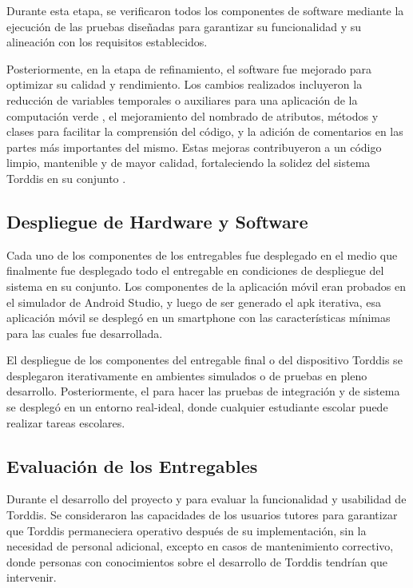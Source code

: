 \documentclass[a4paper,fleqn]{cas-sc}
\begin{document}
			Durante esta etapa, se verificaron todos los componentes de software mediante la ejecución de las pruebas diseñadas para garantizar su funcionalidad y su alineación con los requisitos establecidos.
		
			Posteriormente, en la etapa de refinamiento, el software fue mejorado para optimizar su calidad y rendimiento. Los cambios realizados incluyeron la reducción de variables temporales o auxiliares para una aplicación de la computación verde \cite{Firmansyah2024Integrating}, el mejoramiento del nombrado de atributos, métodos y clases para facilitar la comprensión del código, y la adición de comentarios en las partes más importantes del mismo. Estas mejoras contribuyeron a un código limpio, mantenible y de mayor calidad, fortaleciendo la solidez del sistema Torddis en su conjunto \cite{Marabesi2024Exploring}.
		
		\subsection{Despliegue de Hardware y Software}
			Cada uno de los componentes de los entregables fue  desplegado en el medio que finalmente fue desplegado todo el entregable en condiciones de despliegue del sistema en su conjunto. Los componentes de la aplicación móvil eran probados en el simulador de Android Studio, y luego de ser generado el apk iterativa, esa aplicación móvil se desplegó en un smartphone con las características mínimas para las cuales fue desarrollada.
		
			El despliegue de los componentes del entregable final o del dispositivo Torddis se desplegaron iterativamente en ambientes simulados o de pruebas en pleno desarrollo. Posteriormente, el para hacer las pruebas de integración y de sistema se desplegó en un entorno real-ideal, donde cualquier estudiante escolar puede realizar tareas escolares.
		
		\subsection{Evaluación de los Entregables}
			Durante el desarrollo del proyecto y para evaluar la funcionalidad y usabilidad de Torddis. Se consideraron las capacidades de los usuarios tutores para garantizar que Torddis permaneciera operativo después de su implementación, sin la necesidad de personal adicional, excepto en casos de mantenimiento correctivo, donde personas con conocimientos sobre el desarrollo de Torddis tendrían que intervenir.
			
\end{document}
